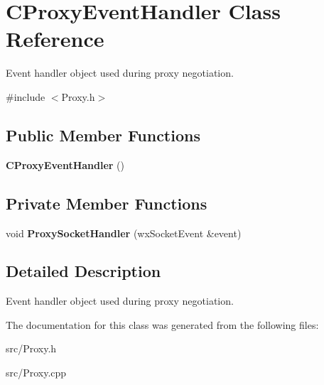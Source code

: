 \section{CProxyEventHandler Class Reference}
\label{classCProxyEventHandler}


Event handler object used during proxy negotiation.  


{\ttfamily \#include $<$Proxy.h$>$}\subsection*{Public Member Functions}
\begin{DoxyCompactItemize}
\item 
{\bf CProxyEventHandler} ()\label{classCProxyEventHandler_af8d8c8ea08bf372030ae6c19d00946c6}

\end{DoxyCompactItemize}
\subsection*{Private Member Functions}
\begin{DoxyCompactItemize}
\item 
void {\bf ProxySocketHandler} (wxSocketEvent \&event)\label{classCProxyEventHandler_a4e988ddc415bb63f6ce03189c7476cc9}

\end{DoxyCompactItemize}


\subsection{Detailed Description}
Event handler object used during proxy negotiation. 

The documentation for this class was generated from the following files:\begin{DoxyCompactItemize}
\item 
src/Proxy.h\item 
src/Proxy.cpp\end{DoxyCompactItemize}
